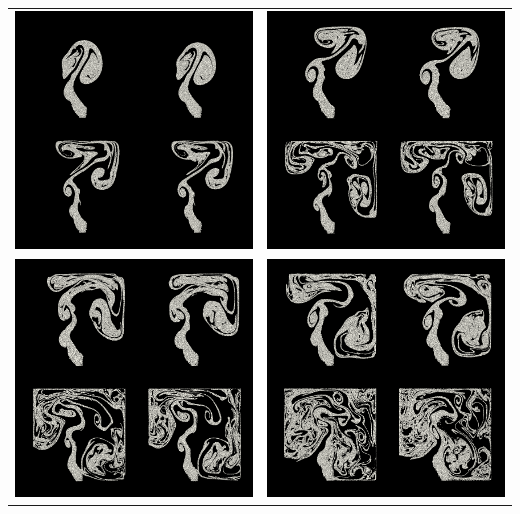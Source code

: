 \documentclass[a4paper,11pt]{article}
\theoremstyle{mytheor}
\begin{document}
\begin{table}[H]
\begin{tabular}{cc}
\includegraphics[width=70mm]{comp_180.png}&\includegraphics[width=70mm]{comp_240.png}\\
\newline
\includegraphics[width=70mm]{comp_300.png}&\includegraphics[width=70mm]{comp_360.png}\\
\end{tabular}
\end{table}
\end{document}
